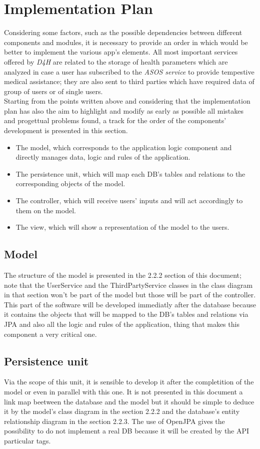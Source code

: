 \section{Implementation Plan}
Considering some factors, such as the possible dependencies between different components and modules, it is necessary to provide an order in which would be better to implement the various app's elements. All most important services offered by \textit{D4H} are related to the storage of health parameters which are analyzed in case a user has subscribed to the \textit{ASOS service} to provide tempestive medical assistance; they are also sent to third parties which have required data of group of users or of single users. \\
Starting from the points written above and considering that the implementation plan has also the aim to highlight and modify as early as possible all mistakes and progettual problems found, a track for the order of the components' development is presented in this section.

\begin{itemize}
	\item The model, which corresponds to the application logic component and directly manages data, logic and rules of the 			application.
	\item The persistence unit, which will map each DB's tables and relations to the corresponding objects of the model. 
	\item The controller, which will receive users' inputs and will act accordingly to them on the model.
	\item The view, which will show a representation of the model to the users.
\end{itemize}
\subsection{Model}
	The structure of the model is presented in the 2.2.2 section of this document; note that the UserService and the ThirdPartyService classes in the class diagram in that section won't be part 		of the model but those will be part of the controller. This part of the software will be developed immediatly after the database because it contains the objects that will be mapped to the			DB's tables and relations via JPA and also all the logic and rules of the application, thing that makes this component a very critical one.
\subsection{Persistence unit}
	Via the scope of this unit, it is sensible to develop it after the completition of the model or even in parallel with this one. It is not presented in this document a link map 	beetween the database and the model but it should be simple to deduce it by the model's class diagram in the section 2.2.2 and the database's entity relationship diagram in the section 			2.2.3. The use of OpenJPA gives the possibility to do not implement a real DB because it will be created by the API particular tags.
